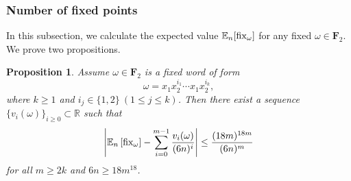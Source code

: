 \documentclass{amsart}
\theoremstyle{plain}
\newtheorem{proposition}[theorem]{Proposition}
\theoremstyle{definition}
\theoremstyle{remark}
\begin{document}
\subsubsection{Number of fixed points}
In this subsection, we calculate the expected value $\mathbb{E}_n[\textnormal{fix}_\omega]$ for any fixed $\omega\in\textbf{F}_2$. We prove two propositions.
\begin{proposition}\label{p-poly-free}
     Assume $\omega\in\textbf{F}_2$ is a fixed word of form
     $$\omega=x_1x_2^{i_1}\cdots x_1x_2^{i_k},$$
where $k\geq 1$ and $i_j\in\{1,2\}\ (1\leq j\leq k)$.
    Then there exist a sequence $\{v_i(\omega)\}_{i\geq 0}\subset \mathbb{R}$  such that 
    $$\left|\mathbb{E}_n\left[\textnormal{fix}_\omega\right]-\sum\limits_{i=0}^{m-1}\frac{v_i(\omega)}{(6n)^i}\right|\leq\frac{(18m)^{18m}}{(6n)^m}$$
    for all $m\geq 2k$ and $6n\geq 18 m^{18}$.
\end{proposition}
\end{document}
